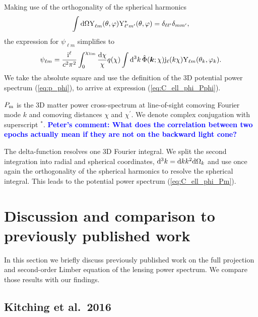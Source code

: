 \documentclass[fleqn,usenatbib]{mnras} %
\renewcommand{\vec}{\bm}
\newcommand{\mk}[1]{{\bf\textcolor{blue}{#1}}}
\begin{document}
\begin{appendix}
Making use of the orthogonality of the spherical harmonics
%
%
\begin{equation}
  \int {\rm d} \Omega {\rm Y}^{}_{\ell m}(\theta, \varphi) {\rm Y}^\ast_{\ell^\prime m^\prime}(\theta, \varphi) = \delta_{\ell \ell^\prime} \delta_{m m^\prime},
  \label{eq:Yellm_ortho}
\end{equation}
%
the expression for $\psi_{\ell m}$ simplifies to
%
\begin{equation}
  \psi_{\ell m} = \frac {{\rm i}^\ell}{c^2 \pi^2} \int_0^{\chi_{\rm lim}} \frac{{\rm d}\chi}{\chi} q(\chi) \int {\rm d}^3 k \,
    \hat \Phi(\vec k; \chi) {\rm j}_\ell(k \chi) {\rm Y}_{\ell m}(\theta_k, \varphi_k).
  \label{eq:psi_ellm}
\end{equation}
%
We take the absolute square and use the definition of the 3D potential power spectrum (\ref{eq:p_phi}),
to arrive at expression (\ref{eq:C_ell_phi_Pphi}).

$P_{\rm m}$ is the 3D matter power cross-spectrum at line-of-sight comoving
Fourier mode $k$ and comoving distances $\chi$ and $\chi^\prime$. We denote
complex conjugation with superscript $^\ast$.
\mk{Peter's comment: What does the correlation between two epochs actually mean if they
are not on the backward light cone?}

The delta-function resolves one 3D Fourier
integral. We split the second integration into radial and spherical
coordinates, ${\rm d}^3 k = {\rm d} k k^2 {\rm d} \Omega_k$ and use once again
the orthogonality of the spherical harmonics to resolve the spherical integral. 
This leads to the potential power spectrum (\ref{eq:C_ell_phi_Pm}).




\section{Discussion and comparison to previously published work}
\label{app:B}

In this section we briefly discuss previously published work on the full
projection and second-order Limber equation of the lensing power spectrum. We
compare those results with our findings.

\subsection{Kitching et al.~2016}


\end{appendix}
\end{document}

